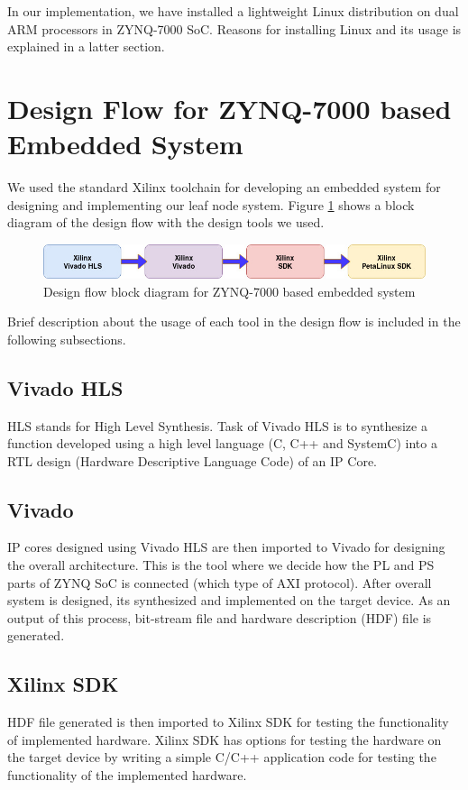 \documentclass[12pt,a4paper]{report}
\begin{document}
In our implementation, we have installed a lightweight Linux distribution on dual ARM processors in ZYNQ-7000 SoC. Reasons for installing Linux and its usage is explained in a latter section.


\section{Design Flow for ZYNQ-7000 based Embedded System}
We used the standard Xilinx toolchain for developing an embedded system for designing and implementing our leaf node system. Figure \ref{design} shows a block diagram of the design flow with the design tools we used.

\begin{figure}[H]
\includegraphics[width=13cm]{design.jpg}
\centering
\caption{Design flow block diagram for ZYNQ-7000 based embedded system}
\label{design}
\end{figure}

Brief description about the usage of each tool in the design flow is included in the following subsections.

\subsection{Vivado HLS}
HLS stands for High Level Synthesis. Task of Vivado HLS is to synthesize a function developed using a high level language (C, C++ and SystemC) into a RTL design (Hardware Descriptive Language Code) of an IP Core. 

\subsection{Vivado}
IP cores designed using Vivado HLS are then imported to Vivado for designing the overall architecture. This is the tool where we decide how the PL and PS parts of ZYNQ SoC is connected (which type of AXI protocol). After overall system is designed, its synthesized and implemented on the target device. As an output of this process, bit-stream file and hardware description (HDF) file is generated.

\subsection{Xilinx SDK}
HDF file generated is then imported to Xilinx SDK for testing the functionality of implemented hardware. Xilinx SDK has options for testing the hardware on the target device by writing a simple C/C++ application code for testing the functionality of the implemented hardware.
\end{document}

